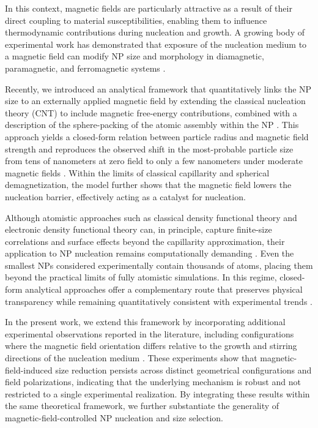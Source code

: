 \documentclass[pdflatex,sn-mathphys-num]{sn-jnl}%
\theoremstyle{thmstyleone}%
\theoremstyle{thmstyletwo}%
\theoremstyle{thmstylethree}%
\begin{document}
In this context, magnetic fields are particularly attractive as a result of their direct coupling to material susceptibilities, enabling them to influence thermodynamic contributions during nucleation and growth. A growing body of experimental work has demonstrated that exposure of the nucleation medium to a magnetic field can modify NP size and morphology in diamagnetic, paramagnetic, and ferromagnetic systems \cite{kthiri2021novel, luo2015strong, ualkhanova2019influence}.

Recently, we introduced an analytical framework that quantitatively links the NP size to an externally applied magnetic field by extending the classical nucleation theory (CNT) to include magnetic free-energy contributions, combined with a description of the sphere-packing of the atomic assembly within the NP \cite{Tawalbeh2025controlling}. This approach yields a closed-form relation between particle radius and magnetic field strength and reproduces the observed shift in the most-probable particle size from tens of nanometers at zero field to only a few nanometers under moderate magnetic fields \cite{kthiri2021novel}. Within the limits of classical capillarity and spherical demagnetization, the model further shows that the magnetic field lowers the nucleation barrier, effectively acting as a catalyst for nucleation.

Although atomistic approaches such as classical density functional theory and electronic density functional theory can, in principle, capture finite-size correlations and surface effects beyond the capillarity approximation, their application to NP nucleation remains computationally demanding \cite{Giovannini2023-fs, PhysRevE.98.012604, D1RA04876G}. Even the smallest NPs considered experimentally contain thousands of atoms, placing them beyond the practical limits of fully atomistic simulations. In this regime, closed-form analytical approaches offer a complementary route that preserves physical transparency while remaining quantitatively consistent with experimental trends \cite{Giovannini2023-fs}.

In the present work, we extend this framework by incorporating additional experimental observations reported in the literature, including configurations where the magnetic field orientation differs relative to the growth and stirring directions of the nucleation medium \cite{li2025effects}. These experiments show that magnetic-field-induced size reduction persists across distinct geometrical configurations and field polarizations, indicating that the underlying mechanism is robust and not restricted to a single experimental realization. By integrating these results within the same theoretical framework, we further substantiate the generality of magnetic-field-controlled NP nucleation and size selection.
\end{document}
